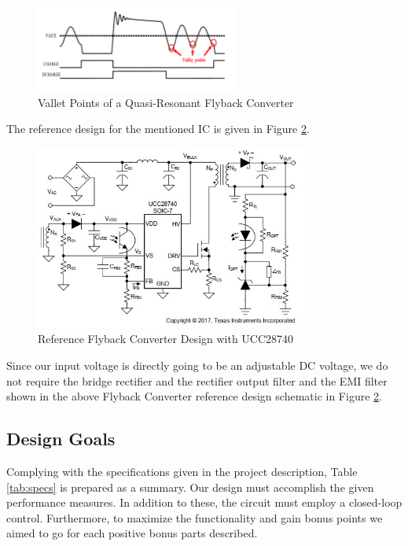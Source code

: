 \begin{figure}[H]
\begin{center}
\includegraphics[width=0.6\textwidth]{figures/valleyswitch.png}
\caption{Vallet Points of a Quasi-Resonant Flyback Converter}
\label{fig:valleyswitch}
\end{center}
\end{figure}

The reference design for the mentioned IC is given in Figure \ref{fig:refdesign}.

\begin{figure}[H]
\begin{center}
\includegraphics[width=0.8\textwidth]{figures/refdesign.jpg}
\caption{Reference Flyback Converter Design with UCC28740}
\label{fig:refdesign}
\end{center}
\end{figure}

Since our input voltage is directly going to be an adjustable DC voltage, we do not require the bridge rectifier and the rectifier output filter and the EMI filter shown in the above Flyback Converter reference design schematic in Figure \ref{fig:refdesign}.

\subsection{Design Goals}

Complying with the specifications given in the project description, Table \ref{tab:specs} is prepared as a summary. Our design must accomplish the given performance measures. In addition to these, the circuit must employ a closed-loop control. Furthermore, to maximize the functionality and gain bonus points we aimed to go for each positive bonus parts described.

